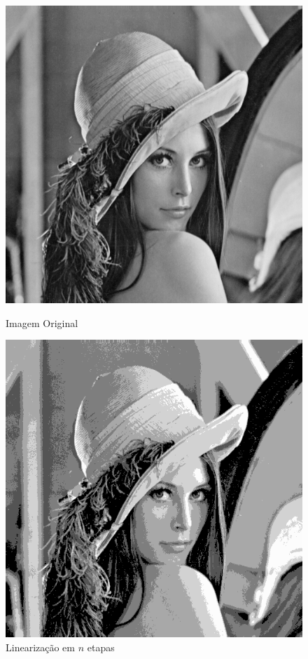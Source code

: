 \documentclass{article}
\begin{document}
\newpage
\begin{figure}[!htb]
\begin{minipage}[b]{0.45\linewidth}
\centering
\includegraphics[scale=0.32]{lena_B.png}
\caption{Imagem Original}
\label{fig:original}
\end{minipage}
\hspace{0.5cm}
\begin{minipage}[b]{0.45\linewidth}
\centering
\includegraphics[scale=0.32]{DiminuirBits.png}
\caption{Linearização em $n$ etapas}
\label{fig:rota}
\end{minipage}
\end{figure}
\end{document}
